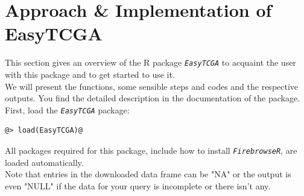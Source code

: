 \documentclass[a4paper,12pt,listof=totoc,bibliography=totoc]{scrartcl}
\begin{document}
\section{Approach \& Implementation of EasyTCGA}
This section gives an overview of the R package \texttt{\em EasyTCGA} to acquaint the user with this package and to get started to use it.\\
We will present the functions, some sensible steps and codes and the respective outputs. You find the detailed description in the
documentation of the package.\\
First, load the \texttt{\em EasyTCGA} package:
\begin{lstlisting}[style=base]
@> load(EasyTCGA)@
\end{lstlisting}
All packages required for this package, include how to install \texttt{\em FirebrowseR}, are loaded automatically.\\
Note that entries in the downloaded data frame can be "NA" or the output is even "NULL" if the data for your query is incomplete or there isn't any.\\
\end{document}
